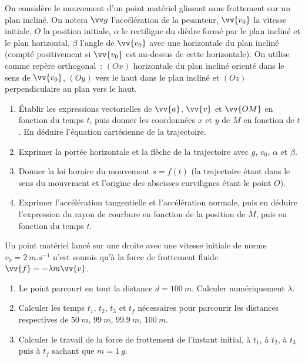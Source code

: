 \begin{exercice}%
  On considère le mouvement d'un point matériel glissant sans frottement sur
  un plan incliné. On notera \(\vg\) l'accélération de la pesanteur,
 \(\vv{v_0}\) la vitesse initiale, \(O\) la position initiale, \(\alpha\) le
  rectiligne du dièdre formé par le plan incliné et le plan horizontal,
 \(\beta\) l'angle de \(\vv{v_0}\) avec une horizontale du plan incliné
  (compté positivement si \(\vv{v_0}\) est au-dessus de cette horizontale).
  On utilise comme repère orthogonal~: \((Ox)\) horizontale du plan incliné
  orienté dans le sens de \(\vv{v_0}\), \((Oy)\) vers le haut dans le plan
  incliné et \((Oz)\) perpendiculaire au plan vers le haut.
  \begin{enumerate}
    \item Établir les expressions vectorielles de \(\vv{a}\), \(\vv{v}\) et
 \(\vv{OM}\) en fonction du temps \(t\), puis donner les coordonnées \(x\)
      et \(y\) de \(M\) en fonction de \(t\). En déduire l'équation cartésienne
    de la trajectoire.
    \item Exprimer la portée horizontale et la flèche de la trajectoire avec
 \(g\), \(v_0\), \(\alpha\) et \(\beta\).
    \item Donner la loi horaire du mouvement \(s=f(t)\) (la trajectoire étant 
      dans
      le sens du mouvement et l'origine des abscisses curvilignes étant le 
      point
 \(O\)).
    \item Exprimer l'accélération tangentielle et l'accélération normale, puis
      en déduire l'expression du rayon de courbure en fonction de la position 
      de
 \(M\), puis en fonction du temps \(t\).
  \end{enumerate}
\end{exercice}%

\begin{exercice}%
  Un point matériel lancé sur une droite avec une vitesse initiale de norme 
  \(v_0
  = \SI{2}{m.s^{-1}}\) n'est soumis qu'à la force de frottement fluide \(\vv{f} 
  =
  -\lambda m \vv{v}\).
  \begin{enumerate}
    \item Le point parcourt en tout la distance \(d = \SI{100}{m}\). Calculer
      numériquement \(\lambda\).
    \item Calculer les temps \(t_1\), \(t_2\), \(t_3\) et \(t_f\) nécessaires 
      pour
      parcourir les distances respectives de \(\SI{50}{m}\), \(\SI{99}{m}\),
 \(\SI{99.9}{m}\), \(\SI{100}{m}\).
    \item Calculer le travail de la force de frottement de l'instant initial, à
 \(t_1\), à \(t_2\), à \(t_3\) puis à \(t_f\) sachant que \(m=\SI{1}{g}\).
  \end{enumerate}
\end{exercice}%

